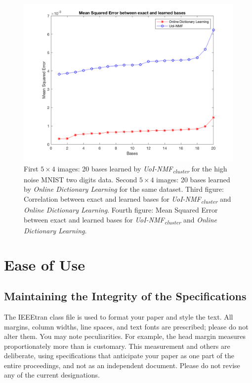 \documentclass[conference]{IEEEtran}
\begin{document}
\begin{figure}[!htb]
\endminipage
{}%
  \includegraphics[width=\linewidth]{mse_2in1}
\endminipage
\caption{First $5\times 4$ images: 20 bases learned by \textit{UoI-NMF\textsubscript{cluster}} for the high noise MNIST two digits data. Second $5\times 4$ images: 20 bases learned by \textit{Online Dictionary Learning} for the same dataset. Third figure: Correlation between exact and learned bases for \textit{UoI-NMF\textsubscript{cluster}} and \textit{Online Dictionary Learning}. Fourth figure: Mean Squared Error between exact and learned bases for \textit{UoI-NMF\textsubscript{cluster}} and \textit{Online Dictionary Learning}. }\label{fig:mnist_4}
\end{figure}


\section{Ease of Use}

\subsection{Maintaining the Integrity of the Specifications}

The IEEEtran class file is used to format your paper and style the text. All margins,
column widths, line spaces, and text fonts are prescribed; please do not
alter them. You may note peculiarities. For example, the head margin
measures proportionately more than is customary. This measurement
and others are deliberate, using specifications that anticipate your paper
as one part of the entire proceedings, and not as an independent document.
Please do not revise any of the current designations.
\end{document}
